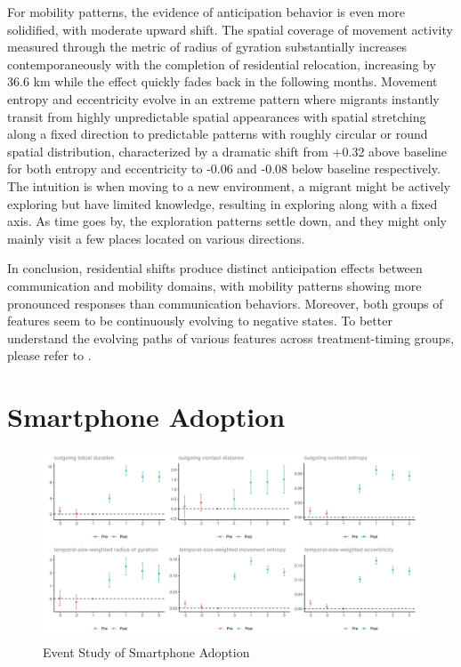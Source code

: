For mobility patterns, the evidence of anticipation behavior is even more solidified, with moderate upward shift. The spatial coverage of movement activity measured through the metric of radius of gyration substantially increases contemporaneously with the completion of residential relocation, increasing by 36.6 km while the effect quickly fades back in the following months. Movement entropy and eccentricity evolve in an extreme pattern where migrants instantly transit from highly unpredictable spatial appearances with spatial stretching along a fixed direction to predictable patterns with roughly circular or round spatial distribution, characterized by a dramatic shift from +0.32 above baseline for both entropy and eccentricity to -0.06 and -0.08 below baseline respectively. The intuition is when moving to a new environment, a migrant might be actively exploring but have limited knowledge, resulting in exploring along with a fixed axis. As time goes by, the exploration patterns settle down, and they might only mainly visit a few places located on various directions.

In conclusion, residential shifts produce distinct anticipation effects between communication and mobility domains, with mobility patterns showing more pronounced responses than communication behaviors. Moreover, both groups of features seem to be continuously evolving to negative states. To better understand the evolving paths of various features across treatment-timing groups, please refer to .

\clearpage\newpage
\section{Smartphone Adoption}
\begin{figure}[h!]
\centering
\caption{Event Study of Smartphone Adoption}
\vspace{0.1cm}

\includegraphics[scale=0.49]{figures/csdid/smartphone_adoption.png}

\label{fig:event_study_smartphone_adoption}
\end{figure}

